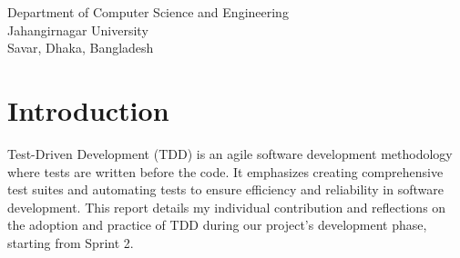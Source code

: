 \documentclass[a4paper,12pt]{article}
\begin{document}
\begin{center}
\begin{table}[h!]
\begin{tabular}{|c|c|c|c|}
        \end{tabular}
    \end{table}

    \vspace{1cm}

    Department of Computer Science and Engineering\\
    Jahangirnagar University\\
    Savar, Dhaka, Bangladesh\\
\end{center}

\newpage

\tableofcontents

\newpage
\pagestyle{fancy}
\fancyhf{}
\fancyfoot[C]{\thepage} %
\section{Introduction}
Test-Driven Development (TDD) is an agile software development methodology where tests are written before the
code. It emphasizes creating comprehensive test suites and automating tests to ensure efficiency and
reliability in software development. This report details my individual contribution and reflections on the
adoption and practice of TDD during our project’s development phase, starting from Sprint 2.
\end{document}
